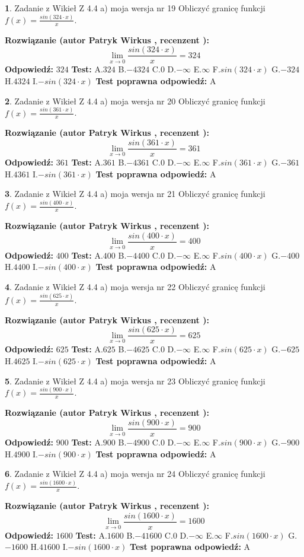 \documentclass[12pt, a4paper]{article}
\theoremstyle{definition} %
\newtheorem{zad}{}
\newcommand{\zadStart}[1]{\begin{zad}#1\newline}
\newcommand{\zadStop}{\end{zad}}
\newcommand{\rozwStart}[2]{\noindent \textbf{Rozwiązanie (autor #1 , recenzent #2): }\newline}
\newcommand{\rozwStop}{\newline}
\newcommand{\odpStart}{\noindent \textbf{Odpowiedź:}\newline}
\newcommand{\odpStop}{\newline}
\newcommand{\testStart}{\noindent \textbf{Test:}\newline}
\newcommand{\testStop}{\newline}
\newcommand{\kluczStart}{\noindent \textbf{Test poprawna odpowiedź:}\newline}
\newcommand{\kluczStop}{\newline}
\begin{document}
\zadStart{Zadanie z Wikieł Z 4.4 a) moja wersja nr 19}
Obliczyć granicę funkcji $f(x)=\frac{sin(324\cdot x)}{x}$.
\zadStop
\rozwStart{Patryk Wirkus}{}
$$\lim\limits_{x\to 0}\frac{sin(324\cdot x)}{x}=
324$$
\rozwStop
\odpStart
$324$
\odpStop
\testStart
A.$324$
B.$-4324$
C.$0$
D.$-\infty$
E.$\infty$
F.$sin(324\cdot x)$
G.$-324$
H.$4324$
I.$-sin(324\cdot x)$
\testStop
\kluczStart
A
\kluczStop



\zadStart{Zadanie z Wikieł Z 4.4 a) moja wersja nr 20}
Obliczyć granicę funkcji $f(x)=\frac{sin(361\cdot x)}{x}$.
\zadStop
\rozwStart{Patryk Wirkus}{}
$$\lim\limits_{x\to 0}\frac{sin(361\cdot x)}{x}=
361$$
\rozwStop
\odpStart
$361$
\odpStop
\testStart
A.$361$
B.$-4361$
C.$0$
D.$-\infty$
E.$\infty$
F.$sin(361\cdot x)$
G.$-361$
H.$4361$
I.$-sin(361\cdot x)$
\testStop
\kluczStart
A
\kluczStop



\zadStart{Zadanie z Wikieł Z 4.4 a) moja wersja nr 21}
Obliczyć granicę funkcji $f(x)=\frac{sin(400\cdot x)}{x}$.
\zadStop
\rozwStart{Patryk Wirkus}{}
$$\lim\limits_{x\to 0}\frac{sin(400\cdot x)}{x}=
400$$
\rozwStop
\odpStart
$400$
\odpStop
\testStart
A.$400$
B.$-4400$
C.$0$
D.$-\infty$
E.$\infty$
F.$sin(400\cdot x)$
G.$-400$
H.$4400$
I.$-sin(400\cdot x)$
\testStop
\kluczStart
A
\kluczStop



\zadStart{Zadanie z Wikieł Z 4.4 a) moja wersja nr 22}
Obliczyć granicę funkcji $f(x)=\frac{sin(625\cdot x)}{x}$.
\zadStop
\rozwStart{Patryk Wirkus}{}
$$\lim\limits_{x\to 0}\frac{sin(625\cdot x)}{x}=
625$$
\rozwStop
\odpStart
$625$
\odpStop
\testStart
A.$625$
B.$-4625$
C.$0$
D.$-\infty$
E.$\infty$
F.$sin(625\cdot x)$
G.$-625$
H.$4625$
I.$-sin(625\cdot x)$
\testStop
\kluczStart
A
\kluczStop



\zadStart{Zadanie z Wikieł Z 4.4 a) moja wersja nr 23}
Obliczyć granicę funkcji $f(x)=\frac{sin(900\cdot x)}{x}$.
\zadStop
\rozwStart{Patryk Wirkus}{}
$$\lim\limits_{x\to 0}\frac{sin(900\cdot x)}{x}=
900$$
\rozwStop
\odpStart
$900$
\odpStop
\testStart
A.$900$
B.$-4900$
C.$0$
D.$-\infty$
E.$\infty$
F.$sin(900\cdot x)$
G.$-900$
H.$4900$
I.$-sin(900\cdot x)$
\testStop
\kluczStart
A
\kluczStop



\zadStart{Zadanie z Wikieł Z 4.4 a) moja wersja nr 24}
Obliczyć granicę funkcji $f(x)=\frac{sin(1600\cdot x)}{x}$.
\zadStop
\rozwStart{Patryk Wirkus}{}
$$\lim\limits_{x\to 0}\frac{sin(1600\cdot x)}{x}=
1600$$
\rozwStop
\odpStart
$1600$
\odpStop
\testStart
A.$1600$
B.$-41600$
C.$0$
D.$-\infty$
E.$\infty$
F.$sin(1600\cdot x)$
G.$-1600$
H.$41600$
I.$-sin(1600\cdot x)$
\testStop
\kluczStart
A
\kluczStop
\end{document}

